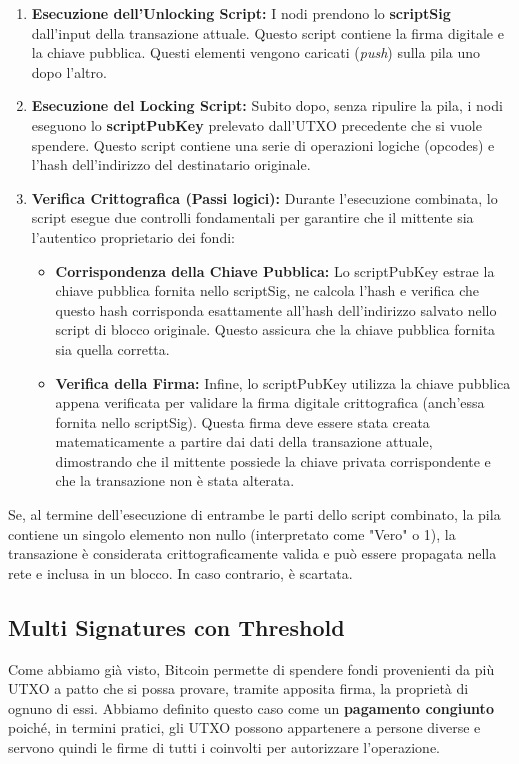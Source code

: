 \begin{enumerate}
    \item \textbf{Esecuzione dell'Unlocking Script:} I nodi prendono lo \textbf{scriptSig} dall'input della transazione attuale. Questo script contiene la firma digitale e la chiave pubblica. Questi elementi vengono caricati (\textit{push}) sulla pila uno dopo l'altro.
    
    \item \textbf{Esecuzione del Locking Script:} Subito dopo, senza ripulire la pila, i nodi eseguono lo \textbf{scriptPubKey} prelevato dall'UTXO precedente che si vuole spendere. Questo script contiene una serie di operazioni logiche (opcodes) e l'hash dell'indirizzo del destinatario originale.
    
    \item \textbf{Verifica Crittografica (Passi logici):} Durante l'esecuzione combinata, lo script esegue due controlli fondamentali per garantire che il mittente sia l'autentico proprietario dei fondi:
    \begin{itemize}
        \item \textbf{Corrispondenza della Chiave Pubblica:} Lo scriptPubKey estrae la chiave pubblica fornita nello scriptSig, ne calcola l'hash e verifica che questo hash corrisponda esattamente all'hash dell'indirizzo salvato nello script di blocco originale. Questo assicura che la chiave pubblica fornita sia quella corretta.
        \item \textbf{Verifica della Firma:} Infine, lo scriptPubKey utilizza la chiave pubblica appena verificata per validare la firma digitale crittografica (anch'essa fornita nello scriptSig). Questa firma deve essere stata creata matematicamente a partire dai dati della transazione attuale, dimostrando che il mittente possiede la chiave privata corrispondente e che la transazione non è stata alterata.
    \end{itemize}
\end{enumerate}

Se, al termine dell'esecuzione di entrambe le parti dello script combinato, la pila contiene un singolo elemento non nullo (interpretato come "Vero" o 1), la transazione è considerata crittograficamente valida e può essere propagata nella rete e inclusa in un blocco. In caso contrario, è scartata.

\subsection{Multi Signatures con Threshold}
Come abbiamo già visto, Bitcoin permette di spendere fondi provenienti da più UTXO a patto che si possa provare, tramite apposita firma, la proprietà di ognuno di essi. Abbiamo definito questo caso come un \textbf{pagamento congiunto} poiché, in termini pratici, gli UTXO possono appartenere a persone diverse e servono quindi le firme di tutti i coinvolti per autorizzare l'operazione.

